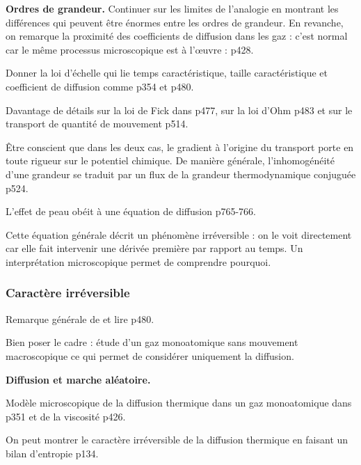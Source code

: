 \begin{slide}
\textbf{Ordres de grandeur.}
Continuer sur les limites de l'analogie en montrant les différences qui peuvent être énormes entre les ordres de grandeur.
En revanche, on remarque la proximité des coefficients de diffusion dans les gaz : c'est normal car le même processus microscopique est à l'œuvre : \cite{Olivier2000} p428.
\end{slide}

Donner la loi d'échelle qui lie temps caractéristique, taille caractéristique et coefficient de diffusion comme \cite{Olivier2000} p354 et \cite{Diu2008} p480.

\begin{remarque}
Davantage de détails sur la loi de Fick dans \cite{Diu2008} p477, sur la loi d'Ohm p483 et sur le transport de quantité de mouvement p514.

\noindent
Être conscient que dans les deux cas, le gradient à l'origine du transport porte en toute rigueur sur le potentiel chimique.
De manière générale, l'inhomogénéité d'une grandeur se traduit par un flux de la grandeur thermodynamique conjuguée \cite{Diu2008} p524.

\noindent
L'effet de peau obéit à une équation de diffusion \cite{Olivier2000} p765-766.
\end{remarque}

\begin{transition}
Cette équation générale décrit un phénomène irréversible : on le voit directement car elle fait intervenir une dérivée première par rapport au temps.
Un interprétation microscopique permet de comprendre pourquoi.
\end{transition}

\subsubsection{Caractère irréversible}

Remarque générale de \cite{Olivier2000} et lire \cite{Diu2008} p480.

Bien poser le cadre : étude d'un gaz monoatomique sans mouvement macroscopique ce qui permet de considérer uniquement la diffusion.

\begin{slide}
\textbf{Diffusion et marche aléatoire.}
\end{slide}

\begin{remarque}
Modèle microscopique de la diffusion thermique dans un gaz monoatomique dans \cite{Olivier2000} p351 et de la viscosité p426.

\noindent
On peut montrer le caractère irréversible de la diffusion thermique en faisant un bilan d'entropie \cite{Sanz2016} p134.
\end{remarque}

